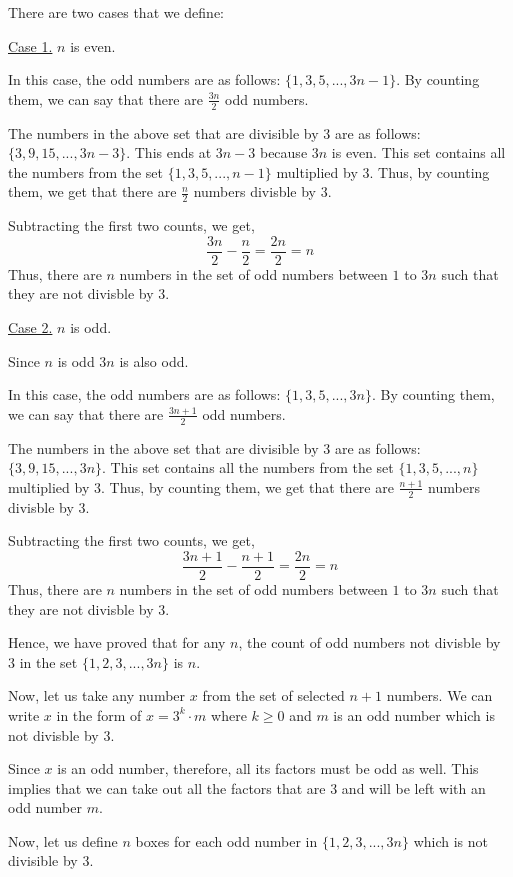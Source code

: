\bs
There are two cases that we define:

\underline{Case 1.} $n$ is even.

In this case, the odd numbers are as follows: $\{1, 3, 5, ..., 3n-1\}$. 
By counting them, we can say that there are $\frac{3n}{2}$ odd numbers.

The numbers in the above set that are divisible by $3$ are as follows:
$\{3, 9, 15, ..., 3n-3\}$. This ends at $3n-3$ because $3n$ is even.
This set contains all the numbers from the set $\{1, 3, 5, ..., n-1\}$ multiplied by $3$.
Thus, by counting them, we get that there are $\frac{n}{2}$ numbers divisble by $3$.

Subtracting the first two counts, we get,
$$\frac{3n}{2} - \frac{n}{2} = \frac{2n}{2} = n$$
Thus, there are $n$ numbers in the set of odd numbers between $1$ to $3n$ such that they are not divisble by $3$.


\underline{Case 2.} $n$ is odd.

Since $n$ is odd $3n$ is also odd.

In this case, the odd numbers are as follows: $\{1, 3, 5, ..., 3n\}$. 
By counting them, we can say that there are $\frac{3n+1}{2}$ odd numbers.

The numbers in the above set that are divisible by $3$ are as follows:
$\{3, 9, 15, ..., 3n\}$.
This set contains all the numbers from the set $\{1, 3, 5, ..., n\}$ multiplied by $3$.
Thus, by counting them, we get that there are $\frac{n+1}{2}$ numbers divisble by $3$.

Subtracting the first two counts, we get,
$$\frac{3n+1}{2} - \frac{n+1}{2} = \frac{2n}{2} = n$$
Thus, there are $n$ numbers in the set of odd numbers between $1$ to $3n$ such that they are not divisble by $3$.


Hence, we have proved that for any $n$, the count of odd numbers not divisble by $3$ in the set $\{1, 2, 3, ..., 3n\}$ is $n$.

Now, let us take any number $x$ from the set of selected $n+1$ numbers. We can write $x$ in the form of $x = 3^k \cdot m$ where $k \geq 0$ and $m$ is an odd number which is not divisble by $3$.

Since $x$ is an odd number, therefore, all its factors must be odd as well. This implies that we can take out all the factors that are $3$ and will be left with an odd number $m$.

Now, let us define $n$ boxes for each odd number in $\{1, 2, 3, ..., 3n\}$ which is not divisible by $3$.

